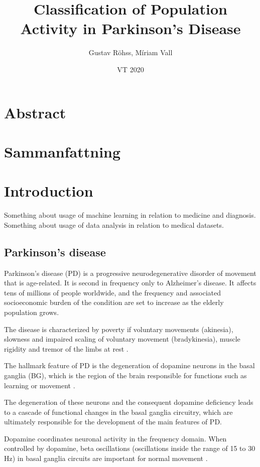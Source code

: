 \documentclass{article}
\title{Classification of Population Activity in Parkinson's Disease}
\author{Gustav Röhss, Míriam Vall}
\date{VT 2020}
\begin{document}
\maketitle

\section*{Abstract}
\section*{Sammanfattning}

\newpage
\tableofcontents

\newpage
\section{Introduction}
Something about usage of machine learning in relation to medicine and diagnosis.
Something about usage of data analysis in relation to medical datasets.

\subsection{Parkinson's disease}
Parkinson’s disease (PD) is a progressive neurodegenerative disorder of movement that is age-related. It is second in frequency only to Alzheimer’s disease. It affects tens of millions of people worldwide, and the frequency and associated socioeconomic burden of the condition are set to increase as the elderly population grows.

The disease is characterized by poverty if voluntary movements (akinesia), slowness and impaired scaling of voluntary movement (bradykinesia), muscle rigidity and tremor of the limbs at rest \citep{DeMaags}.

The hallmark feature of PD is the degeneration of dopamine neurons in the basal ganglia (BG), which is the region of the brain responsible for functions such as learning or movement \citep{Hammond}.

The degeneration of these neurons and the consequent dopamine deficiency leads to a cascade of functional changes in the basal ganglia circuitry, which are ultimately responsible for the development of the main features of PD. 

Dopamine coordinates neuronal activity in the frequency domain. When controlled by dopamine, beta oscillations (oscillations inside the range of 15 to 30 Hz) in basal ganglia circuits are important for normal movement \citep{Cagnan}. 
\end{document}
